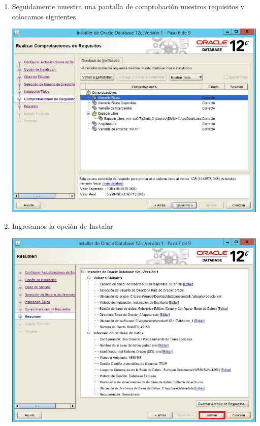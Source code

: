 \begin{enumerate}[1.]
	\item Seguidamente muestra una pantalla de comprobaci\'on nuestros requisitos y colocamos siguientes\\
	\begin{center}
	\includegraphics[width=15cm]{./Imagenes/img20} 
	\end{center}

	\item Ingresamos la opci\'on de Instalar\\
	\begin{center}
	\includegraphics[width=15cm]{./Imagenes/img21} 
	\end{center}


\end{enumerate}
